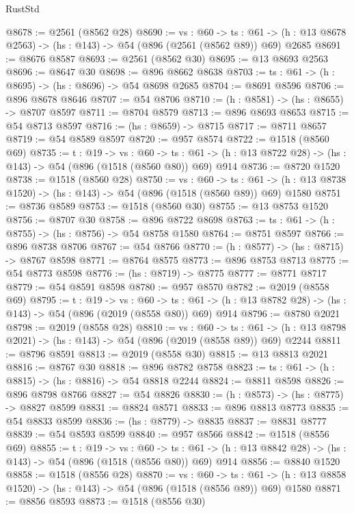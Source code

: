 \begin{lexlean}{RustStd}
\begin{coremodule}
@8678 := @2561 (@8562 @28)
@8690 := {vs : @60} ->
  {ts : @61} -> (h : @13 @8678 @2563) -> (hs : @143) -> @54 (@896 (@2561 (@8562 @89)) @69) @2685
@8691 := @8676 @8587
@8693 := @2561 (@8562 @30)
@8695 := @13 @8693 @2563
@8696 := @8647 @30
@8698 := @896 @8662 @8638
@8703 := {ts : @61} -> (h : @8695) -> (hs : @8696) -> @54 @8698 @2685
@8704 := @8691 @8596
@8706 := @896 @8678 @8646
@8707 := @54 @8706
@8710 := (h : @8581) -> (hs : @8655) -> @8707 @8597
@8711 := @8704 @8579
@8713 := @896 @8693 @8653
@8715 := @54 @8713 @8597
@8716 := (hs : @8659) -> @8715
@8717 := @8711 @8657
@8719 := @54 @8589 @8597
@8720 := @957 @8574
@8722 := @1518 (@8560 @69)
@8735 := {t : @19} ->
  {vs : @60} ->
  {ts : @61} -> (h : @13 @8722 @28) -> (hs : @143) -> @54 (@896 (@1518 (@8560 @80)) @69) @914
@8736 := @8720 @1520
@8738 := @1518 (@8560 @28)
@8750 := {vs : @60} ->
  {ts : @61} -> (h : @13 @8738 @1520) -> (hs : @143) -> @54 (@896 (@1518 (@8560 @89)) @69) @1580
@8751 := @8736 @8589
@8753 := @1518 (@8560 @30)
@8755 := @13 @8753 @1520
@8756 := @8707 @30
@8758 := @896 @8722 @8698
@8763 := {ts : @61} -> (h : @8755) -> (hs : @8756) -> @54 @8758 @1580
@8764 := @8751 @8597
@8766 := @896 @8738 @8706
@8767 := @54 @8766
@8770 := (h : @8577) -> (hs : @8715) -> @8767 @8598
@8771 := @8764 @8575
@8773 := @896 @8753 @8713
@8775 := @54 @8773 @8598
@8776 := (hs : @8719) -> @8775
@8777 := @8771 @8717
@8779 := @54 @8591 @8598
@8780 := @957 @8570
@8782 := @2019 (@8558 @69)
@8795 := {t : @19} ->
  {vs : @60} ->
  {ts : @61} -> (h : @13 @8782 @28) -> (hs : @143) -> @54 (@896 (@2019 (@8558 @80)) @69) @914
@8796 := @8780 @2021
@8798 := @2019 (@8558 @28)
@8810 := {vs : @60} ->
  {ts : @61} -> (h : @13 @8798 @2021) -> (hs : @143) -> @54 (@896 (@2019 (@8558 @89)) @69) @2244
@8811 := @8796 @8591
@8813 := @2019 (@8558 @30)
@8815 := @13 @8813 @2021
@8816 := @8767 @30
@8818 := @896 @8782 @8758
@8823 := {ts : @61} -> (h : @8815) -> (hs : @8816) -> @54 @8818 @2244
@8824 := @8811 @8598
@8826 := @896 @8798 @8766
@8827 := @54 @8826
@8830 := (h : @8573) -> (hs : @8775) -> @8827 @8599
@8831 := @8824 @8571
@8833 := @896 @8813 @8773
@8835 := @54 @8833 @8599
@8836 := (hs : @8779) -> @8835
@8837 := @8831 @8777
@8839 := @54 @8593 @8599
@8840 := @957 @8566
@8842 := @1518 (@8556 @69)
@8855 := {t : @19} ->
  {vs : @60} ->
  {ts : @61} -> (h : @13 @8842 @28) -> (hs : @143) -> @54 (@896 (@1518 (@8556 @80)) @69) @914
@8856 := @8840 @1520
@8858 := @1518 (@8556 @28)
@8870 := {vs : @60} ->
  {ts : @61} -> (h : @13 @8858 @1520) -> (hs : @143) -> @54 (@896 (@1518 (@8556 @89)) @69) @1580
@8871 := @8856 @8593
@8873 := @1518 (@8556 @30)

\end{coremodule}
\end{lexlean}

